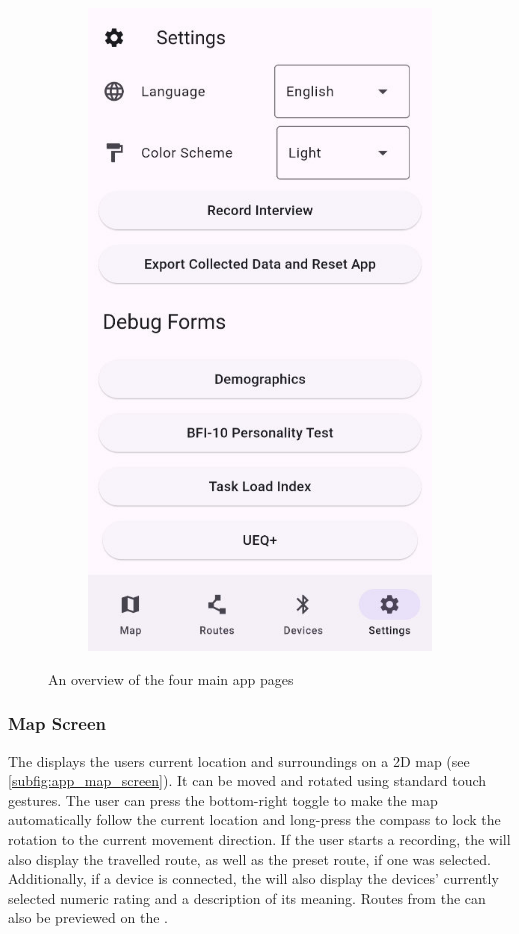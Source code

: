 \begin{figure}[!htb]
\begin{subfigure}{.25\textwidth}
        \includegraphics[width=.8666\linewidth]{images/app_settings_screen.jpg}
        \caption{\settingsscreen}
        \label{subfig:app_settings_screen}
    \end{subfigure}
    \caption{An overview of the four main app pages}
\end{figure}

\subsubsection*{Map Screen}

The \mapscreen displays the users current location and surroundings on a 2D map (see \autoref{subfig:app_map_screen}).
It can be moved and rotated using standard touch gestures.
The user can press the bottom-right toggle to make the map automatically follow the current location and long-press the compass to lock the rotation to the current movement direction.
If the user starts a recording, the \mapscreen will also display the travelled route, as well as the preset route, if one was selected.
Additionally, if a \likertshift device is connected, the \mapscreen will also display the devices' currently selected numeric rating and a description of its meaning.
Routes from the \routesscreen can also be previewed on the \mapscreen.

